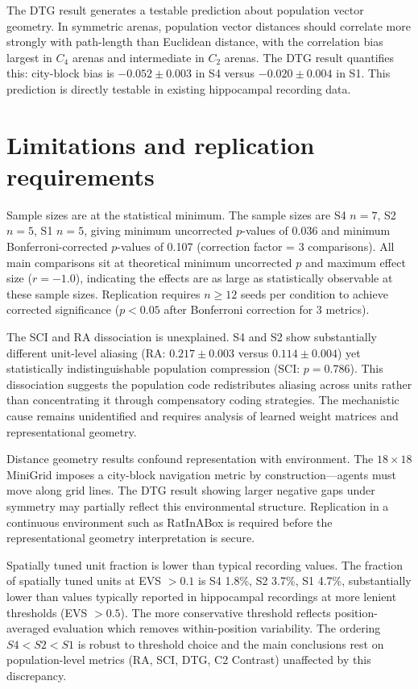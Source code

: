 \documentclass[11pt, a4paper]{article}
\begin{document}
The DTG result generates a testable prediction about population vector geometry. In symmetric arenas, population vector distances should correlate more strongly with path-length than Euclidean distance, with the correlation bias largest in $C_4$ arenas and intermediate in $C_2$ arenas. The DTG result quantifies this: city-block bias is $-0.052 \pm 0.003$ in S4 versus $-0.020 \pm 0.004$ in S1. This prediction is directly testable in existing hippocampal recording data.



\section*{Limitations and replication requirements}

Sample sizes are at the statistical minimum. The sample sizes are S4 $n=7$, S2 $n=5$, S1 $n=5$, giving minimum uncorrected $p$-values of 0.036 and minimum Bonferroni-corrected $p$-values of 0.107 (correction factor = 3 comparisons). All main comparisons sit at theoretical minimum uncorrected $p$ and maximum effect size ($r = -1.0$), indicating the effects are as large as statistically observable at these sample sizes. Replication requires $n \geq 12$ seeds per condition to achieve corrected significance ($p < 0.05$ after Bonferroni correction for 3 metrics).

The SCI and RA dissociation is unexplained. S4 and S2 show substantially different unit-level aliasing (RA: $0.217 \pm 0.003$ versus $0.114 \pm 0.004$) yet statistically indistinguishable population compression (SCI: $p = 0.786$). This dissociation suggests the population code redistributes aliasing across units rather than concentrating it through compensatory coding strategies. The mechanistic cause remains unidentified and requires analysis of learned weight matrices and representational geometry.

Distance geometry results confound representation with environment. The $18 \times 18$ MiniGrid imposes a city-block navigation metric by construction---agents must move along grid lines. The DTG result showing larger negative gaps under symmetry may partially reflect this environmental structure. Replication in a continuous environment such as RatInABox is required before the representational geometry interpretation is secure.

Spatially tuned unit fraction is lower than typical recording values. The fraction of spatially tuned units at EVS $> 0.1$ is S4 1.8\%, S2 3.7\%, S1 4.7\%, substantially lower than values typically reported in hippocampal recordings at more lenient thresholds (EVS $> 0.5$). The more conservative threshold reflects position-averaged evaluation which removes within-position variability. The ordering $S4 < S2 < S1$ is robust to threshold choice and the main conclusions rest on population-level metrics (RA, SCI, DTG, C2 Contrast) unaffected by this discrepancy.
\end{document}
